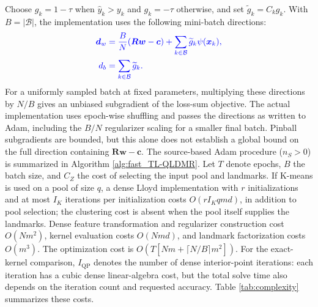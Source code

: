 \documentclass[a4paper]{cas-sc}
\begin{document}
{\color{blue}Choose $g_k=1-\tau$ when $\hat y_k>y_k$ and $g_k=-\tau$ otherwise, and set $\widetilde g_k=C_kg_k$. With $B=|\mathcal B|$, the implementation uses the following mini-batch directions:}
\begin{equation}
\label{eq:param_gradients}
{\color{blue}\begin{aligned}
\boldsymbol{d}_w&=\frac{B}{N}(\boldsymbol{R}\boldsymbol{w}-\boldsymbol{c})+\sum_{k\in\mathcal B}\widetilde g_k\psi(\boldsymbol{x}_k),\\
d_b&=\sum_{k\in\mathcal B}\widetilde g_k.
\end{aligned}}
\end{equation}
{\color{blue}For a uniformly sampled batch at fixed parameters, multiplying these directions by $N/B$ gives an unbiased subgradient of the loss-sum objective. The actual implementation uses epoch-wise shuffling and passes the directions as written to Adam, including the $B/N$ regularizer scaling for a smaller final batch. Pinball subgradients are bounded, but this alone does not establish a global bound on the full direction containing $\boldsymbol{R}\boldsymbol{w}-\boldsymbol{c}$.}
{\color{blue}The source-based Adam procedure ($n_S>0$) is summarized in Algorithm \ref{alg:fast_TL-QLDMR}.} {\color{blue}Let $T$ denote epochs, $B$ the batch size, and $C_Z$ the cost of selecting the input pool and landmarks. If K-means is used on a pool of size $q$, a dense Lloyd implementation with $r$ initializations and at most $I_K$ iterations per initialization costs $O(rI_Kqmd)$, in addition to pool selection; the clustering cost is absent when the pool itself supplies the landmarks. Dense feature transformation and regularizer construction cost $O(Nm^2)$, kernel evaluation costs $O(Nmd)$, and landmark factorization costs $O(m^3)$. The optimization cost is $O(T[Nm+\lceil N/B\rceil m^2])$. For the exact-kernel comparison, $I_{\mathrm{QP}}$ denotes the number of dense interior-point iterations: each iteration has a cubic dense linear-algebra cost, but the total solve time also depends on the iteration count and requested accuracy.} Table \ref{tab:complexity} summarizes these costs.
\end{document}

